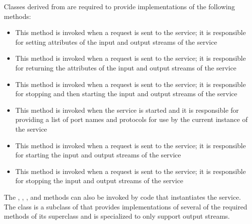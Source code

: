 Classes derived from  are required to provide
implementations of the following methods:
\begin{itemize}
\item\exSp{} This method is invoked when a
 request is sent to the service; it
is responsible for setting attributes of the input and output streams of the service
\item\exSp{} This method is invoked when a
 request is sent to the service;
it is responsible for returning the attributes of the input and output streams of the
service
\item\exSp{} This method is invoked when a
 request is sent to the
service; it is responsible for stopping and then starting the input and output streams of
the service
\item\exSp{} This method is invoked when the service is
started and it is responsible for providing a list of port names and protocols for use by
the current instance of the service
\item\exSp{} This method is invoked when a
 request is sent to the service;
it is responsible for starting the input and output streams of the service
\item\exSp{} This method is invoked when a
 request is sent to the service;
it is responsible for stopping the input and output streams of the service
\end{itemize}
The , , ,
 and  methods can also be invoked by code that
instantiates the service.
The  class is a subclass of
 that provides implementations of several of
the required methods of its superclass and is specialized to only support output
streams.\\

